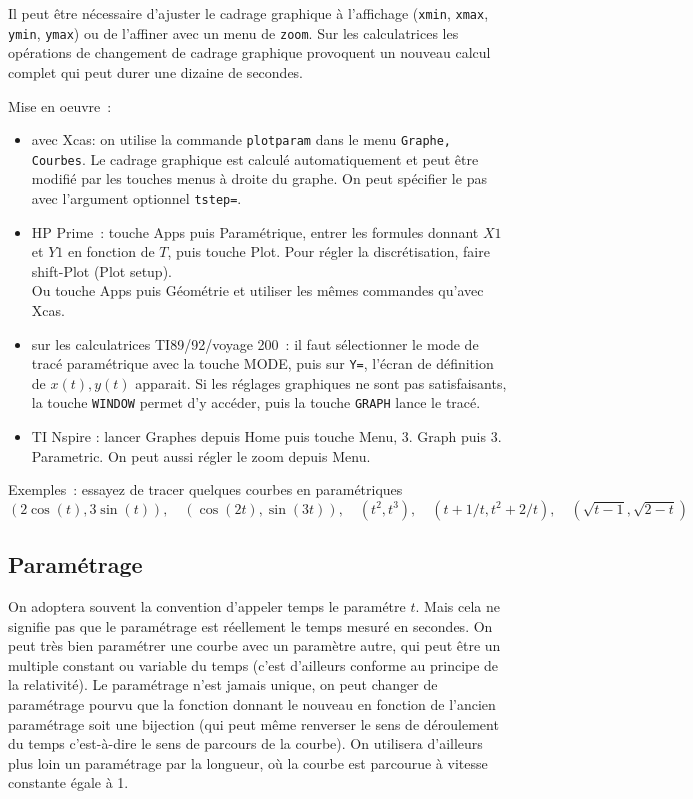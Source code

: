 \documentclass[a4paper,11pt]{article}
\begin{document}
\begin{giacjshere}
Il peut \^etre n\'ecessaire d'ajuster le cadrage graphique
\`a l'affichage (\verb|xmin|, \verb|xmax|, \verb|ymin|, \verb|ymax|) ou
de l'affiner avec un menu de \verb|zoom|. Sur les calculatrices
les op\'erations de changement de cadrage graphique
provoquent un nouveau calcul complet qui peut durer une
dizaine de secondes.

Mise en oeuvre~:
\begin{itemize}
\item avec Xcas: on utilise la commande \verb|plotparam|
dans le menu \verb|Graphe, Courbes|. Le cadrage
graphique est calcul\'e automatiquement et peut \^etre
modifi\'e par les touches menus \`a droite du graphe.
On peut sp\'ecifier le pas avec l'argument optionnel \verb|tstep=|.
\item HP Prime~: touche Apps puis Param\'etrique, entrer les
formules donnant $X1$ et $Y1$ en fonction de $T$, puis touche
Plot. Pour r\'egler la discr\'etisation, faire shift-Plot (Plot
setup).\\
Ou touche Apps puis G\'eom\'etrie et utiliser les m\^emes commandes 
qu'avec Xcas.
\item sur les calculatrices TI89/92/voyage 200~: il faut s\'electionner le mode
de trac\'e param\'etrique avec la touche MODE,
puis sur \verb|Y=|, l'\'ecran de d\'efinition
de $x(t),y(t)$ apparait. Si les r\'eglages graphiques
ne sont pas satisfaisants, la touche \verb|WINDOW|
permet d'y acc\'eder, puis la touche \verb|GRAPH| lance
le trac\'e.
\item TI Nspire : lancer Graphes depuis Home puis touche Menu,
3. Graph puis 3. Parametric. On peut aussi r\'egler le zoom depuis Menu.
\end{itemize}

Exemples~: essayez de tracer quelques courbes en param\'etriques
$$ (2\cos(t),3\sin(t)), \quad (\cos(2t),\sin(3t)), \quad (t^2,t^3),
\quad (t+1/t, t^2+2/t), \quad (\sqrt{t-1},\sqrt{2-t}) $$

\subsection{Param\'etrage}
On adoptera souvent la convention d'appeler temps le param\'etre $t$.
Mais cela ne signifie pas que le param\'etrage est r\'eellement le
temps mesur\'e en secondes. On peut tr\`es bien param\'etrer une
courbe avec un param\`etre autre, qui peut \^etre un multiple 
constant ou variable du temps (c'est d'ailleurs conforme au
principe de la relativit\'e). Le param\'etrage n'est jamais unique,
on peut changer de param\'etrage pourvu que la fonction donnant
le nouveau en fonction de l'ancien param\'etrage soit une bijection
(qui peut m\^eme renverser le sens de d\'eroulement du temps
c'est-\`a-dire le sens de parcours de la courbe). On utilisera
d'ailleurs plus loin un param\'etrage par la longueur,
o\`u la courbe est parcourue \`a vitesse constante \'egale \`a 1.


\end{giacjshere}
\end{document}
